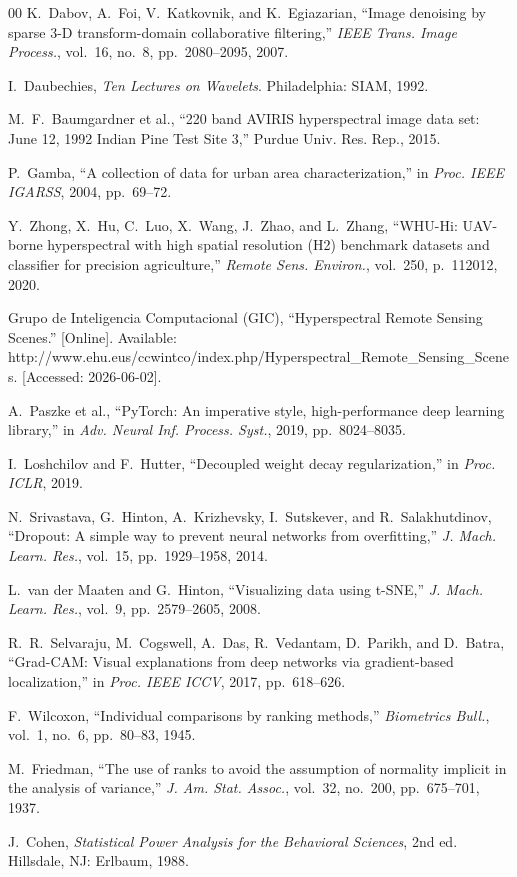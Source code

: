\documentclass[conference]{IEEEtran}
\begin{document}
\begin{thebibliography}{00}
K.~Dabov, A.~Foi, V.~Katkovnik, and K.~Egiazarian, ``Image denoising by sparse 3-D transform-domain collaborative filtering,'' \textit{IEEE Trans. Image Process.}, vol.~16, no.~8, pp.~2080--2095, 2007.

I.~Daubechies, \textit{Ten Lectures on Wavelets}. Philadelphia: SIAM, 1992.

M.~F.~Baumgardner et al., ``220 band AVIRIS hyperspectral image data set: June 12, 1992 Indian Pine Test Site 3,'' Purdue Univ. Res. Rep., 2015.

P.~Gamba, ``A collection of data for urban area characterization,'' in \textit{Proc. IEEE IGARSS}, 2004, pp.~69--72.

Y.~Zhong, X.~Hu, C.~Luo, X.~Wang, J.~Zhao, and L.~Zhang, ``WHU-Hi: UAV-borne hyperspectral with high spatial resolution (H2) benchmark datasets and classifier for precision agriculture,'' \textit{Remote Sens. Environ.}, vol.~250, p.~112012, 2020.

Grupo de Inteligencia Computacional (GIC), ``Hyperspectral Remote Sensing Scenes.'' [Online]. Available: http://www.ehu.eus/ccwintco/index.php/Hyperspectral\_Remote\_Sensing\_Scenes. [Accessed: 2026-06-02].

A.~Paszke et al., ``PyTorch: An imperative style, high-performance deep learning library,'' in \textit{Adv. Neural Inf. Process. Syst.}, 2019, pp.~8024--8035.

I.~Loshchilov and F.~Hutter, ``Decoupled weight decay regularization,'' in \textit{Proc. ICLR}, 2019.

N.~Srivastava, G.~Hinton, A.~Krizhevsky, I.~Sutskever, and R.~Salakhutdinov, ``Dropout: A simple way to prevent neural networks from overfitting,'' \textit{J. Mach. Learn. Res.}, vol.~15, pp.~1929--1958, 2014.

L.~van der Maaten and G.~Hinton, ``Visualizing data using t-SNE,'' \textit{J. Mach. Learn. Res.}, vol.~9, pp.~2579--2605, 2008.

R.~R.~Selvaraju, M.~Cogswell, A.~Das, R.~Vedantam, D.~Parikh, and D.~Batra, ``Grad-CAM: Visual explanations from deep networks via gradient-based localization,'' in \textit{Proc. IEEE ICCV}, 2017, pp.~618--626.

F.~Wilcoxon, ``Individual comparisons by ranking methods,'' \textit{Biometrics Bull.}, vol.~1, no.~6, pp.~80--83, 1945.

M.~Friedman, ``The use of ranks to avoid the assumption of normality implicit in the analysis of variance,'' \textit{J. Am. Stat. Assoc.}, vol.~32, no.~200, pp.~675--701, 1937.

J.~Cohen, \textit{Statistical Power Analysis for the Behavioral Sciences}, 2nd ed. Hillsdale, NJ: Erlbaum, 1988.

\end{thebibliography}
\end{document}
